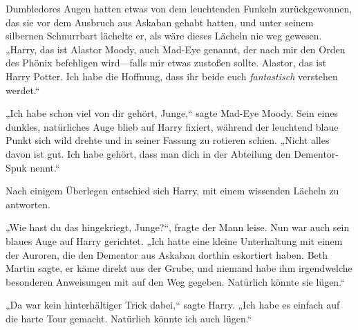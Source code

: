 Dumbledores Augen hatten etwas von dem leuchtenden Funkeln zurückgewonnen, das sie vor dem Ausbruch aus Askaban gehabt hatten, und unter seinem silbernen Schnurrbart lächelte er, als wäre dieses Lächeln nie weg gewesen. „Harry, das ist Alastor Moody, auch Mad-Eye genannt, der nach mir den Orden des Phönix befehligen wird—falls mir etwas zustoßen sollte. Alastor, das ist Harry Potter. Ich habe die Hoffnung, dass ihr beide euch \emph{fantastisch} verstehen werdet.“

„Ich habe schon viel von dir gehört, Junge,“ sagte Mad-Eye Moody. Sein eines dunkles, natürliches Auge blieb auf Harry fixiert, während der leuchtend blaue Punkt sich wild drehte und in seiner Fassung zu rotieren schien. „Nicht alles davon ist gut. Ich habe gehört, dass man dich in der Abteilung den Dementor-Spuk nennt.“

Nach einigem Überlegen entschied sich Harry, mit einem wissenden Lächeln zu antworten.

„Wie hast du das hingekriegt, Junge?“, fragte der Mann leise. Nun war auch sein blaues Auge auf Harry gerichtet. „Ich hatte eine kleine Unterhaltung mit einem der Auroren, die den Dementor aus Askaban dorthin eskortiert haben. Beth Martin sagte, er käme direkt aus der Grube, und niemand habe ihm irgendwelche besonderen Anweisungen mit auf den Weg gegeben. Natürlich könnte sie lügen.“

„Da war kein hinterhältiger Trick dabei,“ sagte Harry. „Ich habe es einfach auf die harte Tour gemacht. Natürlich könnte ich auch lügen.“

